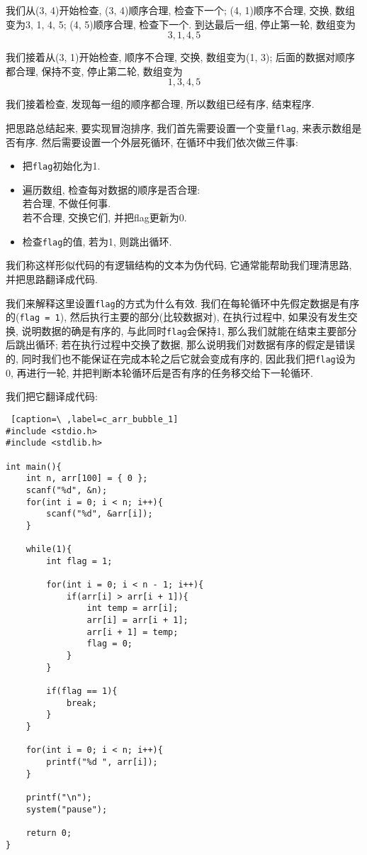             我们从(3, 4)开始检查, (3, 4)顺序合理, 检查下一个; (4, 1)顺序不合理, 交换, 数组变为3, 1, 4, 5; (4, 5)顺序合理, 检查下一个. 到达最后一组, 停止第一轮, 数组变为
                \[ 3, 1, 4, 5 \]

            我们接着从(3, 1)开始检查, 顺序不合理, 交换, 数组变为(1, 3); 后面的数据对顺序都合理, 保持不变, 停止第二轮, 数组变为
                \[ 1, 3, 4, 5 \]

            我们接着检查, 发现每一组的顺序都合理, 所以数组已经有序, 结束程序.

            把思路总结起来, 要实现冒泡排序, 我们首先需要设置一个变量\texttt{flag}, 来表示数组是否有序. 然后需要设置一个外层死循环, 在循环中我们依次做三件事:
            \begin{itemize}
                \item 把\texttt{flag}初始化为1.
                \item 遍历数组, 检查每对数据的顺序是否合理: \\
                      若合理, 不做任何事. \\
                      若不合理, 交换它们, 并把flag更新为0. 
                \item 检查\texttt{flag}的值, 若为1, 则跳出循环.
            \end{itemize}

            我们称这样形似代码的有逻辑结构的文本为伪代码, 它通常能帮助我们理清思路, 并把思路翻译成代码.

            我们来解释这里设置\texttt{flag}的方式为什么有效. 我们在每轮循环中先假定数据是有序的(\texttt{flag = 1}), 然后执行主要的部分(比较数据对), 在执行过程中, 如果没有发生交换, 说明数据的确是有序的, 与此同时\texttt{flag}会保持1, 那么我们就能在结束主要部分后跳出循环; 若在执行过程中交换了数据, 那么说明我们对数据有序的假定是错误的, 同时我们也不能保证在完成本轮之后它就会变成有序的, 因此我们把\texttt{flag}设为0, 再进行一轮, 并把判断本轮循环后是否有序的任务移交给下一轮循环.

            我们把它翻译成代码:
\begin{lstlisting} [caption=\ ,label=c_arr_bubble_1]
#include <stdio.h>
#include <stdlib.h>

int main(){
    int n, arr[100] = { 0 };
    scanf("%d", &n);
    for(int i = 0; i < n; i++){
        scanf("%d", &arr[i]);
    }

    while(1){
        int flag = 1;

        for(int i = 0; i < n - 1; i++){
            if(arr[i] > arr[i + 1]){
                int temp = arr[i];
                arr[i] = arr[i + 1];
                arr[i + 1] = temp;
                flag = 0;
            }
        }

        if(flag == 1){
            break;
        }
    }

    for(int i = 0; i < n; i++){
        printf("%d ", arr[i]);
    }

    printf("\n");
    system("pause");

    return 0;
}
\end{lstlisting}

